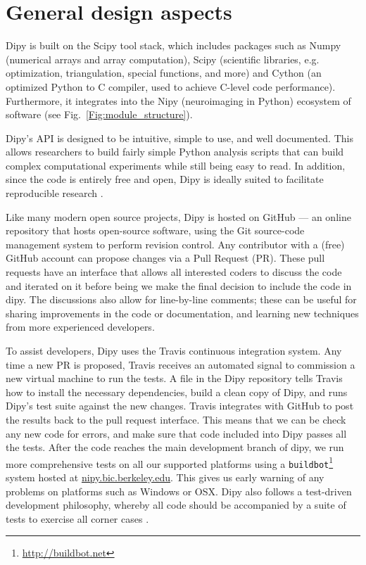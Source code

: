 \documentclass{bioinfo}
\begin{document}
\section{General design aspects}

Dipy is built on the Scipy tool stack, which includes packages such as
Numpy (numerical arrays and array computation), Scipy
(scientific libraries, e.g. optimization, triangulation, special functions,
and more) and Cython (an optimized Python to C compiler, used to achieve
C-level code performance).  Furthermore, it integrates into the Nipy
(neuroimaging in Python) ecosystem of software (see
Fig.~\ref{Fig:module_structure}).

Dipy's API is designed to be intuitive, simple to use, and well
documented.  This allows researchers to build fairly simple Python analysis
scripts that can build complex computational experiments while still being easy
to read.  In addition, since the code is entirely free and open, Dipy is ideally
suited to facilitate reproducible research \citep{Donoho2010}.

Like many modern open source projects, Dipy is hosted on GitHub --- an online
repository that hosts open-source software, using the Git source-code
management system to perform revision control. Any contributor with a (free)
GitHub account can propose changes via a Pull Request (PR). These pull requests
have an interface that allows all interested coders to discuss the code and
iterated on it before being we make the final decision to include the code in
dipy. The discussions also allow for line-by-line comments; these can be useful
for sharing improvements in the code or documentation, and learning new
techniques from more experienced developers.

To assist developers, Dipy uses the Travis continuous integration system.  Any
time a new PR is proposed, Travis receives an automated signal to commission a
new virtual machine to run the tests.  A file in the Dipy repository tells
Travis how to install the necessary dependencies, build a clean copy of
Dipy, and runs Dipy's test suite against the new changes.  Travis integrates
with GitHub to post the results back to the pull request interface. This means
that we can be check any new code for errors, and make sure that code included
into Dipy passes all the tests. After the code reaches the main development
branch of dipy, we run more comprehensive tests on all our supported
platforms using a \texttt{buildbot}\footnote{\url{http://buildbot.net}} system hosted at
\url{nipy.bic.berkeley.edu}. This gives us early warning of any problems on
platforms such as Windows or OSX.  Dipy also follows a test-driven development
philosophy, whereby all code should be accompanied by a suite of tests to
exercise all corner cases \citep{Maximilien2003}.
\end{document}
